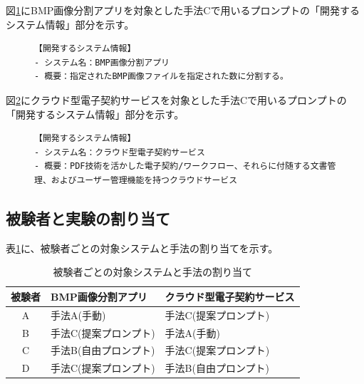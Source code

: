 図\ref{fig:bmp}にBMP画像分割アプリを対象とした手法Cで用いるプロンプトの「開発するシステム情報」部分を示す。
\begin{figure}[tp]
\begin{tcolorbox}[
  colback=white,
  colframe=blue,
  fonttitle=\bfseries,
]
\footnotesize
\ttfamily
\fontsize{10}{11}\selectfont
\begin{verbatim}
【開発するシステム情報】
- システム名：BMP画像分割アプリ
- 概要：指定されたBMP画像ファイルを指定された数に分割する。
\end{verbatim}
\end{tcolorbox}
\label{fig:bmp}
\end{figure}

図\ref{fig:cloud}にクラウド型電子契約サービスを対象とした手法Cで用いるプロンプトの「開発するシステム情報」部分を示す。
\begin{figure}[tp]
\begin{tcolorbox}[
  colback=white,
  colframe=blue,
  fonttitle=\bfseries,
]
\footnotesize
\ttfamily
\fontsize{10}{11}\selectfont
\begin{verbatim}
【開発するシステム情報】
- システム名：クラウド型電子契約サービス
- 概要：PDF技術を活かした電子契約/ワークフロー、それらに付随する文書管理、およびユーザー管理機能を持つクラウドサービス
\end{verbatim}
\end{tcolorbox}
\label{fig:cloud}
\end{figure}

\subsection{被験者と実験の割り当て}

表\ref{tb:experiment_allocation}に、被験者ごとの対象システムと手法の割り当てを示す。

\begin{table}[tp]
  \caption{被験者ごとの対象システムと手法の割り当て}
  \label{tb:experiment_allocation}
  \centering
  \begin{tabular}{|c|l|l|}
    \hline
    \textbf{被験者} & \textbf{BMP画像分割アプリ} & \textbf{クラウド型電子契約サービス} \\
    \hline\hline
    A & 手法A(手動) & 手法C(提案プロンプト) \\
    \hline
    B & 手法C(提案プロンプト) & 手法A(手動) \\
    \hline
    C & 手法B(自由プロンプト) & 手法C(提案プロンプト) \\
    \hline
    D & 手法C(提案プロンプト) & 手法B(自由プロンプト) \\
    \hline
  \end{tabular}
\end{table}

